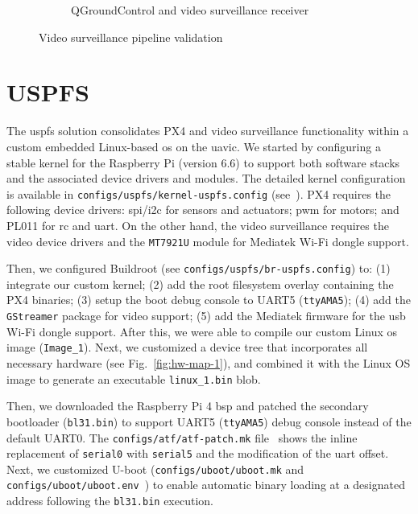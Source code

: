 \begin{figure}[htb!]
\begin{subfigure}[t]{.48\textwidth}
  \caption{QGroundControl and video surveillance receiver}%
  \label{fig:px4-qgc-cam-1}
  \end{subfigure}
  \caption{Video surveillance pipeline validation}%
  \label{fig:px4-qgc-cam}
\end{figure}

\section{USPFS}
\label{sec:uspfs-implem}
The \gls{uspfs} solution consolidates PX4 and video surveillance functionality
within a custom embedded Linux-based \gls{os} on the \gls{uavic}.
We started by configuring a stable kernel for the Raspberry Pi (version 6.6)  to
support both software stacks and the associated device drivers and modules.
The detailed kernel configuration is available in
\lstinline{configs/uspfs/kernel-uspfs.config} (see~\cite{thesis-sw-github}). PX4
requires the following device drivers: \gls{spi}/\gls{i2c} for sensors and
actuators; \gls{pwm} for motors; and PL011 for \gls{rc} and \gls{uart}. On the other
hand, the video surveillance requires the video device drivers and the \lstinline{MT7921U} module for Mediatek Wi-Fi dongle support.

Then, we configured Buildroot (see \lstinline{configs/uspfs/br-uspfs.config}) to:
(1) integrate our custom kernel; (2) add the root filesystem overlay containing
the PX4 binaries; (3) setup the boot debug console to UART5
(\lstinline{ttyAMA5}); (4) add the \lstinline{GStreamer} package for video
support; (5) add the Mediatek firmware for the \gls{usb} Wi-Fi dongle support.
After this, we were able to compile our custom Linux \gls{os} image (\lstinline{Image_1}).   
Next, we customized a device tree that incorporates all necessary hardware
(see Fig.~\ref{fig:hw-map-1}), and combined it with the Linux OS image to
generate an executable \lstinline{linux_1.bin} blob.

Then, we downloaded the Raspberry Pi 4 \gls{bsp} and patched the secondary
bootloader (\lstinline{bl31.bin}) to support UART5 (\lstinline{ttyAMA5}) debug
console instead of the default UART0. The \lstinline{configs/atf/atf-patch.mk}
file~\cite{thesis-sw-github} shows the inline replacement of \lstinline{serial0}
with \lstinline{serial5} and the modification of the \gls{uart} offset. Next, we
customized U-boot (\lstinline{configs/uboot/uboot.mk} and \lstinline{configs/uboot/uboot.env}~\cite{thesis-sw-github})
to enable automatic binary loading at a designated address following the \lstinline{bl31.bin} execution.

